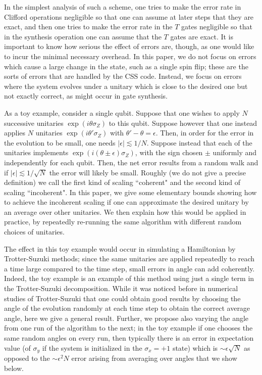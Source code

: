 \documentclass[aps,prl,amsmath,amssymb,amsfonts,superscriptaddress,floatfix]{revtex4}
\begin{document}
In the simplest analysis of such a scheme, one tries to make the error rate in Clifford operations negligible so that one can assume at later steps that they are exact, and then one tries to make the error rate in the $T$ gates negligible
so that in the synthesis operation one can assume that the $T$ gates are exact.
It is important to know how serious the effect of errors are, though, as one would like to incur the minimal necessary overhead.  In this paper, we do not focus on errors which cause a large change in the state, such as a single spin flip; these are the sorts of errors that are handled by the CSS code.  Instead,
we focus on errors where the system evolves under a unitary which is close to the desired one but not exactly correct, as might occur in gate synthesis.


As a toy example, consider a single qubit.  Suppose that one wishes to apply $N$ successive unitaries $\exp(i \theta \sigma_Z)$ to this qubit.  Suppose however that one instead applies $N$ unitaries $\exp(i \theta' \sigma_Z)$ with
$\theta'-\theta=\epsilon$.
Then, in order for the error in the evolution to be small, one needs $|\epsilon| \lesssim 1/N$.
Suppose instead that each of the unitaries implements $\exp(i (\theta \pm \epsilon) \sigma_Z)$, with the sign chosen $\pm$ uniformly and independently for each qubit.  Then, the net error results from a random walk and if $|\epsilon| \lesssim 1/\sqrt{N}$ the error will likely be small.
Roughly (we do not give a precise definition) we call the first kind of scaling ``coherent" and the second kind of scaling ``incoherent".  In this paper, we give some elementary bounds showing how to achieve the incoherent
scaling if one can approximate the desired unitary by an average over other unitaries.  We then explain how this would be applied in practice, by repeatedly re-running the same algorithm with different random choices of unitaries.

The effect in this toy example would occur in simulating a Hamiltonian by Trotter-Suzuki methods\cite{lloyd}; since the same unitaries are applied repeatedly to reach a time large compared to the time step, small errors in angle can add coherently.  Indeed, the toy example is an example of this method using just a single term in the Trotter-Suzuki decomposition.  
While it was noticed before\cite{unpub} in numerical studies of Trotter-Suzuki that one could obtain good results by choosing the angle of the evolution randomly at each time step to obtain the correct average angle, here
we give a general result.  Further, we propose also varying the angle from one run of the algorithm to the next; in the toy example if one chooses the same random angles on every run, then typically there is an error in expectation value (of $\sigma_y$ if the system is initialized in the $\sigma_x=+1$ state) which is $\sim \epsilon\sqrt{N}$ as opposed to the $\sim \epsilon^2 N$ error arising from averaging over angles that we show below.
\end{document}
